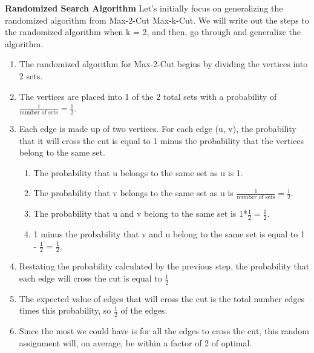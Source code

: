 \documentclass[11pt, solution, letterpaper]{format}
\begin{document}
\textbf{Randomized Search Algorithm} 
Let's initially focus on generalizing the randomized algorithm from Max-2-Cut Max-k-Cut. We will write out the steps to the randomized algorithm when k = 2, and then, go through and generalize the algorithm. 
\begin{enumerate}
  \item The randomized algorithm for Max-2-Cut begins by dividing the vertices into 2 sets.
  \item The vertices are placed into 1 of the 2 total sets with a probability of $\frac{1}{\text{number of sets}}=\frac{1}{2}$. 
  \item  Each edge is made up of two vertices. For each edge (u, v), the probability that it will cross the cut is equal to 1 minus the probability that the vertices belong to the same set. 
  \begin{enumerate}
  \item The probability that u belongs to the same set as u is 1. 
  \item The probability that v belongs to the same set as u is $\frac{1}{\text{number of sets}} = \frac{1}{2}$.
  \item  The probability that u and v belong to the same set is 1*$\frac{1}{2} = \frac{1}{2}$.
  \item 1 minus the probability that v and u belong to the same set is equal to 1 - $\frac{1}{2}$ = $\frac{1}{2}$.
  \end{enumerate}
  \item Restating the probability calculated by the previous step, the probability that each edge will cross the cut is equal to $\frac{1}{2}$
  \item The expected value of edges that will cross the cut is the total number edges times this probability, so  $\frac{1}{2}$ of the edges.
  \item    Since the most we could have is for all the edges to cross the cut, this random assignment will, on average, be within a factor of 2 of optimal.
\end{enumerate}
\end{document}
